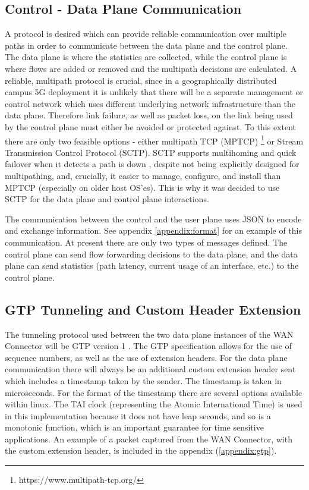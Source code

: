 
\subsection{Control - Data Plane Communication}

A protocol is desired which can provide reliable communication over multiple paths in order to communicate between the data plane and the control plane. The data plane is where the statistics are collected, while the control plane is where flows are added or removed and the multipath decisions are calculated. A reliable, multipath protocol is crucial, since in a geographically distributed campus 5G deployment it is unlikely that there will be a separate management or control network which uses different underlying network infrastructure than the data plane. Therefore link failure, as well as packet loss, on the link being used by the control plane must either be avoided or protected against. To this extent there are only two feasible options - either multipath TCP (MPTCP) \footnote{https://www.multipath-tcp.org/} or Stream Transmission Control Protocol (SCTP). SCTP supports multihoming and quick failover when it detects a path is down \cite{sctp-spec, sctp-failover}, despite not being explicitly designed for multipathing, and, crucially, it easier to manage, configure, and install than MPTCP (especially on older host OS'es). This is why it was decided to use SCTP for the data plane and control plane interactions.

The communication between the control and the user plane uses JSON to encode and exchange information. See appendix \ref{appendix:format} for an example of this communication. At present there are only two types of messages defined. The control plane can send flow forwarding decisions to the data plane, and the data plane can send statistics (path latency, current usage of an interface, etc.) to the control plane.

\subsection{GTP Tunneling and Custom Header Extension}

The tunneling protocol used between the two data plane instances of the WAN Connector will  be GTP version 1 \cite{3gpp.29.060}. The GTP specification allows for the use of sequence numbers, as well as the use of extension headers. For the data plane communication there will always be an additional custom extension header sent which includes a timestamp taken by the sender. The timestamp is taken in microseconds. For the format of the timestamp there are several options available within linux. The TAI clock (representing the Atomic International Time) is used in this implementation because it does not have leap seconds, and so is a monotonic function, which is an important guarantee for time sensitive applications. An example of a packet captured from the WAN Connector, with the custom extension header, is included in the appendix (\ref{appendix:gtp}).

